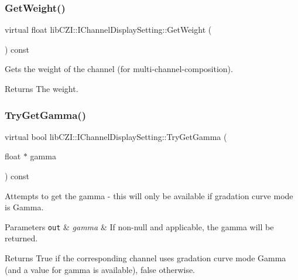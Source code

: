 \subsubsection{\texorpdfstring{Get\+Weight()}{GetWeight()}}
{\footnotesize\ttfamily virtual float lib\+C\+Z\+I\+::\+I\+Channel\+Display\+Setting\+::\+Get\+Weight (\begin{DoxyParamCaption}{ }\end{DoxyParamCaption}) const\hspace{0.3cm}{\ttfamily [pure virtual]}}

Gets the weight of the channel (for multi-\/channel-\/composition).

\begin{DoxyReturn}{Returns}
The weight. 
\end{DoxyReturn}
\mbox{\label{classlib_c_z_i_1_1_i_channel_display_setting_a37a0c8e3159e6a5e3a9cd0c22b90fd2f}} 
\subsubsection{\texorpdfstring{Try\+Get\+Gamma()}{TryGetGamma()}}
{\footnotesize\ttfamily virtual bool lib\+C\+Z\+I\+::\+I\+Channel\+Display\+Setting\+::\+Try\+Get\+Gamma (\begin{DoxyParamCaption}\item[{float $\ast$}]{gamma }\end{DoxyParamCaption}) const\hspace{0.3cm}{\ttfamily [pure virtual]}}

Attempts to get the gamma -\/ this will only be available if gradation curve mode is {\ttfamily Gamma}.


\begin{DoxyParams}[1]{Parameters}
\mbox{\tt out}  & {\em gamma} & If non-\/null and applicable, the gamma will be returned.\\
\hline
\end{DoxyParams}
\begin{DoxyReturn}{Returns}
True if the corresponding channel uses gradation curve mode {\ttfamily Gamma} (and a value for gamma is available), false otherwise. 
\end{DoxyReturn}
\mbox{\label{classlib_c_z_i_1_1_i_channel_display_setting_ae8a2192fd92015fc6ce59958b598a8cb}} 
